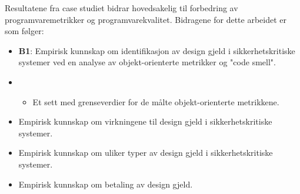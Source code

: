 Resultatene fra case studiet bidrar hovedsakelig til forbedring av programvaremetrikker og programvarekvalitet. Bidragene for dette arbeidet er som følger:
\begin{itemize}
	\item \textbf{B1}: Empirisk kunnskap om identifikasjon av design gjeld i sikkerhetskritiske systemer ved en analyse av objekt-orienterte metrikker og "code smell".
	\item \begin{itemize}
		\item Et sett med grenseverdier for de målte objekt-orienterte metrikkene.
	\end{itemize}
	\item Empirisk kunnskap om virkningene til design gjeld i sikkerhetskritiske systemer.
	\item Empirisk kunnskap om uliker typer av design gjeld i sikkerhetskritiske systemer.
	\item Empirisk kunnskap om betaling av design gjeld.
\end{itemize}

\cleardoublepage
